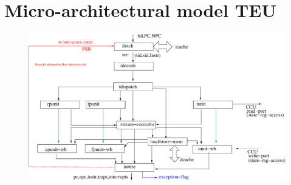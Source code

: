 
\chapter{Micro-architectural model TEU}
\label{appTEU} %

\begin{figure}[h!]
	\centering
	\def\svgwidth{\columnwidth}
	\includegraphics[width=\textwidth]{Figs/appTEU/appTEU}
\end{figure}

